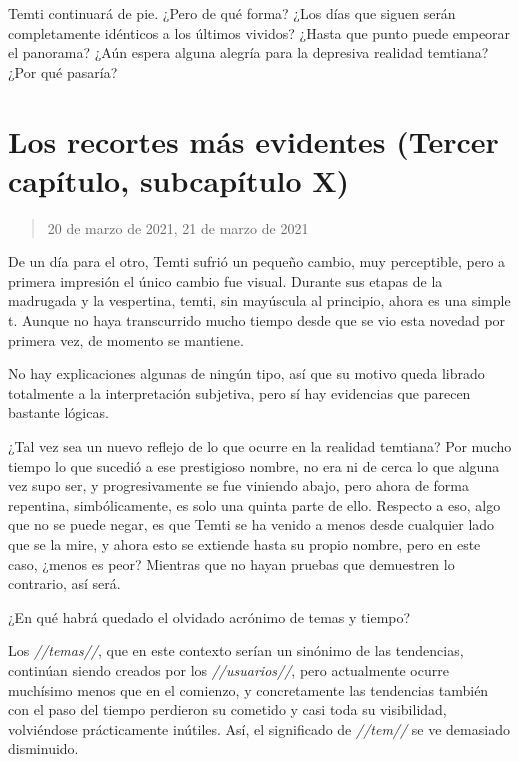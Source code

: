 \documentclass[
  spanish,
]{book}
\begin{document}
Temti continuará de pie. ¿Pero de qué forma? ¿Los días que siguen serán completamente idénticos a los últimos vividos? ¿Hasta que punto puede empeorar el panorama? ¿Aún espera alguna alegría para la depresiva realidad temtiana? ¿Por qué pasaría?

\hypertarget{los-recortes-muxe1s-evidentes-tercer-capuxedtulo-subcapuxedtulo-x}{%
\section{Los recortes más evidentes (Tercer capítulo, subcapítulo X)}\label{los-recortes-muxe1s-evidentes-tercer-capuxedtulo-subcapuxedtulo-x}}

\begin{quote}
20 de marzo de 2021, 21 de marzo de 2021
\end{quote}

De un día para el otro, Temti sufrió un pequeño cambio, muy perceptible, pero a primera impresión el único cambio fue visual. Durante sus etapas de la madrugada y la vespertina, temti, sin mayúscula al principio, ahora es una simple t. Aunque no haya transcurrido mucho tiempo desde que se vio esta novedad por primera vez, de momento se mantiene.

No hay explicaciones algunas de ningún tipo, así que su motivo queda librado totalmente a la interpretación subjetiva, pero sí hay evidencias que parecen bastante lógicas.

¿Tal vez sea un nuevo reflejo de lo que ocurre en la realidad temtiana?
Por mucho tiempo lo que sucedió a ese prestigioso nombre, no era ni de cerca lo que alguna vez supo ser, y progresivamente se fue viniendo abajo, pero ahora de forma repentina, simbólicamente, es solo una quinta parte de ello. Respecto a eso, algo que no se puede negar, es que Temti se ha venido a menos desde cualquier lado que se la mire, y ahora esto se extiende hasta su propio nombre, pero en este caso, ¿menos es peor?
Mientras que no hayan pruebas que demuestren lo contrario, así será.

¿En qué habrá quedado el olvidado acrónimo de temas y tiempo?

Los \emph{//temas//}, que en este contexto serían un sinónimo de las tendencias, continúan siendo creados por los \emph{//usuarios//}, pero actualmente ocurre muchísimo menos que en el comienzo, y concretamente las tendencias también con el paso del tiempo perdieron su cometido y casi toda su visibilidad, volviéndose prácticamente inútiles. Así, el significado de \emph{//tem//} se ve demasiado disminuido.
\end{document}
